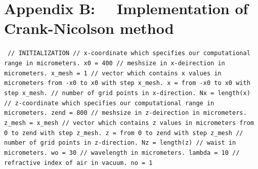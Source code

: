 \documentclass[a4paper]{article}
\begin{document}
	\section*{Appendix B: ~~Implementation of Crank-Nicolson method}
		\texttt{\noindent
			\textcolor{OliveGreen}{// INITIALIZATION\newline\newline
		// x-coordinate which specifies our computational range in micrometers.}\newline
		x0 = 400 \newline
		\textcolor{OliveGreen}{// meshsize in x-deirection in micrometers.}\newline
		x\_mesh = 1 \newline
		\textcolor{OliveGreen}{// vector which contains x values in micrometers from -x0 to x0 with step x\_mesh.}\newline
		x = from -x0 to x0 with step x\_mesh.\newline
		\textcolor{OliveGreen}{// number of grid points in x-direction.}\newline
		Nx = length(x)\newline\newline
		\textcolor{OliveGreen}{// z-coordinate which specifies our computational range in micrometers.}\newline
		zend = 800 \newline
		\textcolor{OliveGreen}{// meshsize in z-deirection in micrometers.}\newline
		z\_mesh = x\_mesh \newline
		\textcolor{OliveGreen}{// vector which contains z values in micrometers from 0 to zend with step z\_mesh.}\newline
		z = from 0 to zend with step z\_mesh\newline
		\textcolor{OliveGreen}{// number of grid points in z-direction.}\newline
		Nz = length(z)\newline
		\textcolor{OliveGreen}{// waist in micrometers.}\newline
		wo = 30 \newline
		\textcolor{OliveGreen}{// wavelength in micrometers.}\newline
		lambda = 10\newline
		\textcolor{OliveGreen}{// refractive index of air in vacuum.}\newline
		no = 1\newline
}
\end{document}
